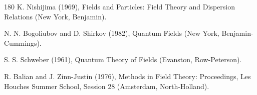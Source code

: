 \begin{thebibliography}{180}
 K. Nishijima (1969), Fields and Particles: Field Theory and Dispersion Relations (New York, Benjamin).

 N. N. Bogoliubov and D. Shirkov (1982), Quantum Fields (New York, Benjamin-Cummings).

 S. S. Schweber (1961), Quantum Theory of Fields (Evanston, Row-Peterson).

 R. Balian and J. Zinn-Justin (1976), Methods in Field Theory: Proceedings, Les Houches Summer School, Session 28 (Amsterdam, North-Holland).

\end{thebibliography}
